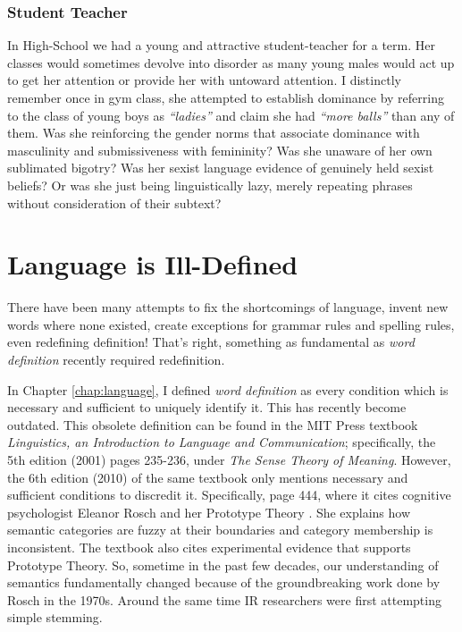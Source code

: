 \subsubsection{Student Teacher}
In High-School we had a young and attractive student-teacher for a term. Her classes would sometimes devolve into disorder as many young males would act up to get her attention or provide her with untoward attention. I distinctly remember once in gym class, she attempted to establish dominance by referring to the class of young boys as \textit{``ladies''} and claim she had \textit{``more balls''} than any of them. Was she reinforcing the gender norms that associate dominance with masculinity and submissiveness with femininity? Was she unaware of her own sublimated bigotry? Was her sexist language evidence of genuinely held sexist beliefs? Or was she just being linguistically lazy, merely repeating phrases without consideration of their subtext?


\section{Language is Ill-Defined}

There have been many attempts to fix the shortcomings of language, invent new words where none existed, create exceptions for grammar rules and spelling rules, even redefining definition! That's right, something as fundamental as \textit{word definition} recently required redefinition.


In Chapter \ref{chap:language}, I defined \textit{word definition} as every condition which is necessary and sufficient to uniquely identify it. This has recently become outdated. This obsolete definition can be found in the MIT Press textbook \textit{Linguistics, an Introduction to Language and Communication}; specifically, the 5th edition (2001) pages 235-236, under \textit{The Sense Theory of Meaning}. However, the 6th edition (2010) of the same textbook only mentions necessary and sufficient conditions to discredit it. Specifically, page 444, where it cites cognitive psychologist Eleanor Rosch and her Prototype Theory \cite{rosch1973internal, rosch1975family}. She explains how semantic categories are fuzzy at their boundaries and category membership is inconsistent. The textbook also cites experimental evidence that supports Prototype Theory. So, sometime in the past few decades, our understanding of semantics fundamentally changed because of the groundbreaking work done by Rosch in the 1970s. Around the same time IR researchers were first attempting simple stemming.

